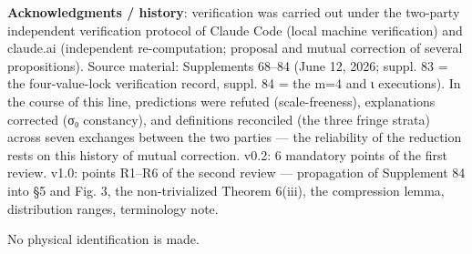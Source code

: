 \documentclass[
]{ltjsarticle}
\begin{document}
\textbf{Acknowledgments / history}: verification was carried out under
the two-party independent verification protocol of Claude Code (local
machine verification) and claude.ai (independent re-computation;
proposal and mutual correction of several propositions). Source
material: Supplements 68--84 (June 12, 2026; suppl. 83 = the
four-value-lock verification record, suppl. 84 = the m=4 and ι
executions). In the course of this line, predictions were refuted
(scale-freeness), explanations corrected (σ₀ constancy), and definitions
reconciled (the three fringe strata) across seven exchanges between the
two parties --- the reliability of the reduction rests on this history
of mutual correction. v0.2: 6 mandatory points of the first review.
v1.0: points R1--R6 of the second review --- propagation of Supplement
84 into §5 and Fig. 3, the non-trivialized Theorem 6(iii), the
compression lemma, distribution ranges, terminology note.

No physical identification is made.
\end{document}
